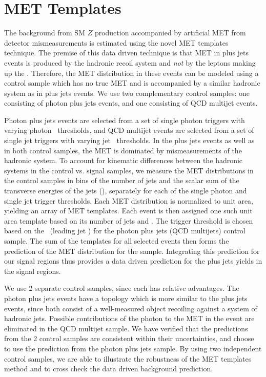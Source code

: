 \section{MET Templates}
\label{sec:templates}

The background from SM $Z$ production accompanied by artificial MET from detector mismeasurements
is estimated using the novel MET templates technique.
The premise of this data driven technique is that MET in \Z plus jets events
is produced by the hadronic recoil system and {\it not} by the leptons making up the \Z.
Therefore, the MET distribution in these events can be modeled using a control sample
which has no true MET and is accompanied by a similar hadronic system as in \Z plus jets events.
We use two complementary control samples: one consisting of photon plus jets events, and one
consisting of QCD multijet events. 

Photon plus jets events are selected from a set of single photon
triggers with varying photon \pt\ thresholds, and QCD multijet events are selected from a set
of single jet triggers with varying jet \pt\ thresholds. 
In the \Z plus jets events as well as in both control samples, the MET is dominated by mismeasurements
of the hadronic system. To account for kinematic 
differences between the hadronic systems in the control vs. signal samples, 
we measure the MET distributions in the control samples in bins of the number of jets and the 
scalar sum of the transverse energies of the jets (\Ht), separately for each of the single photon and single jet trigger thresholds.
Each MET distribution is normalized to unit area, yielding an
array of MET templates. Each \Z event is then assigned one such unit area template based on its number of jets and \Ht.
The trigger threshold is chosen based on the \Z \pt\ (leading jet \pt) for the photon plus
jets (QCD multijets) control sample.
The sum of the templates for all selected \Z events then forms the 
prediction of the MET distribution for the \Z sample. Integrating this prediction for our 
signal regions  thus provides a data driven prediction for the \Z plus jets yields in the 
signal regions. 

We use 2 separate control samples, since each has relative advantages. The photon plus jets events have a topology
which is more similar to the \Z plus jets events, since both consist of a well-measured
object recoiling against a system of hadronic jets. Possible contributions of the photon
to the MET in the event are eliminated in the QCD multijet sample. We have verified that
the predictions from the 2 control samples are consistent within their uncertainties, and
choose to use the prediction from the photon plus jets sample.
By using two independent control samples, we are able to illustrate
the robustness of the MET templates method and to cross check the data driven background 
prediction.

